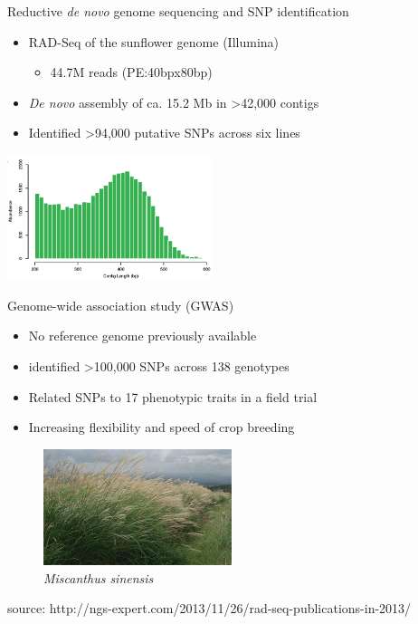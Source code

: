 \documentclass[presentation]{beamer}
\begin{document}
\begin{frame}[label=sec-1-0-3]{Reductive \emph{de novo} genome sequencing and SNP identification}
\begin{itemize}
\item RAD-Seq of the sunflower genome (Illumina)
\begin{itemize}
\item 44.7M reads (PE:40bpx80bp)
\end{itemize}
\item \emph{De novo} assembly of ca. 15.2 Mb 
in >42,000 contigs
\item Identified >94,000 putative SNPs across six lines
\end{itemize}
\begin{center}

\includegraphics[width=6cm]{Pegadarju2013Fig3a.png}


\tiny{\citep{Pegadaraju2013}}
\end{center}
\end{frame}





\begin{frame}[label=sec-1-0-4]{Genome-wide association study (GWAS)}
\begin{itemize}
\item No reference genome previously available
\item identified >100,000 SNPs across 138 genotypes
\item Related SNPs to 17 phenotypic traits in a field trial
\item Increasing flexibility and speed of crop breeding
\end{itemize}


\begin{figure}[htb]
\centering
\includegraphics[width=5.5cm]{miscanthus.png}
\caption{\emph{Miscanthus sinensis}}
\end{figure}




\begin{center}
\tiny{source: http://ngs-expert.com/2013/11/26/rad-seq-publications-in-2013/}
\tiny{\citep{Slavov2014}}
\end{center}
\end{frame}
\end{document}
